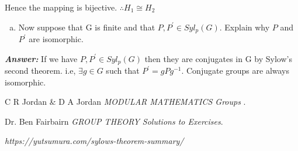\documentclass[11pt,a4paper]{article}
\begin{document}
\begin{enumerate}[4.]
\begin{flushleft}
			Hence the mapping is bijective. $\therefore H_1 \cong H_2 $
		\end{flushleft}
		\begin{enumerate}[(b)]
			\item Now suppose that G is finite and that $P, P^{\prime} \in Syl_p(G)$. Explain why $P$ and $P^{\prime}$ are isomorphic.
		\end{enumerate}
		\begin{flushleft}
			\textbf{\textit{Answer:}}
			If we have $P, P^{\prime} \in Syl_p(G)$ then they are conjugates in G by Sylow's second theorem. i.e, $\exists g \in G$ such that  $P^{\prime} = gPg^{-1}$. Conjugate groups are always isomorphic.
		\end{flushleft} 
	\end{enumerate}
	
	\begin{thebibliography}{unsrt}
		
		C R Jordan \& D A Jordan \emph{MODULAR MATHEMATICS Groups }.
		
		Dr. Ben Fairbairn \emph{GROUP THEORY Solutions to Exercises}.
		
		\emph{https://yutsumura.com/sylows-theorem-summary/}
		
	\end{thebibliography}
	
\end{document}
